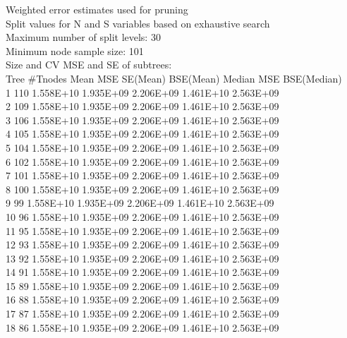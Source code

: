 \documentclass[12pt]{article}
\begin{document}
 Weighted error estimates used for pruning\\
 Split values for N and S variables based on exhaustive search\\
 Maximum number of split levels: 30\\
 Minimum node sample size: 101\\
 Size and CV MSE and SE of subtrees:\\
  Tree   \#Tnodes  Mean MSE   SE(Mean)    BSE(Mean)  Median MSE  BSE(Median)\\
    1      110   1.558E+10   1.935E+09   2.206E+09   1.461E+10   2.563E+09\\
    2      109   1.558E+10   1.935E+09   2.206E+09   1.461E+10   2.563E+09\\
    3      106   1.558E+10   1.935E+09   2.206E+09   1.461E+10   2.563E+09\\
    4      105   1.558E+10   1.935E+09   2.206E+09   1.461E+10   2.563E+09\\
    5      104   1.558E+10   1.935E+09   2.206E+09   1.461E+10   2.563E+09\\
    6      102   1.558E+10   1.935E+09   2.206E+09   1.461E+10   2.563E+09\\
    7      101   1.558E+10   1.935E+09   2.206E+09   1.461E+10   2.563E+09\\
    8      100   1.558E+10   1.935E+09   2.206E+09   1.461E+10   2.563E+09\\
    9       99   1.558E+10   1.935E+09   2.206E+09   1.461E+10   2.563E+09\\
   10       96   1.558E+10   1.935E+09   2.206E+09   1.461E+10   2.563E+09\\
   11       95   1.558E+10   1.935E+09   2.206E+09   1.461E+10   2.563E+09\\
   12       93   1.558E+10   1.935E+09   2.206E+09   1.461E+10   2.563E+09\\
   13       92   1.558E+10   1.935E+09   2.206E+09   1.461E+10   2.563E+09\\
   14       91   1.558E+10   1.935E+09   2.206E+09   1.461E+10   2.563E+09\\
   15       89   1.558E+10   1.935E+09   2.206E+09   1.461E+10   2.563E+09\\
   16       88   1.558E+10   1.935E+09   2.206E+09   1.461E+10   2.563E+09\\
   17       87   1.558E+10   1.935E+09   2.206E+09   1.461E+10   2.563E+09\\
   18       86   1.558E+10   1.935E+09   2.206E+09   1.461E+10   2.563E+09\\
\end{document}
